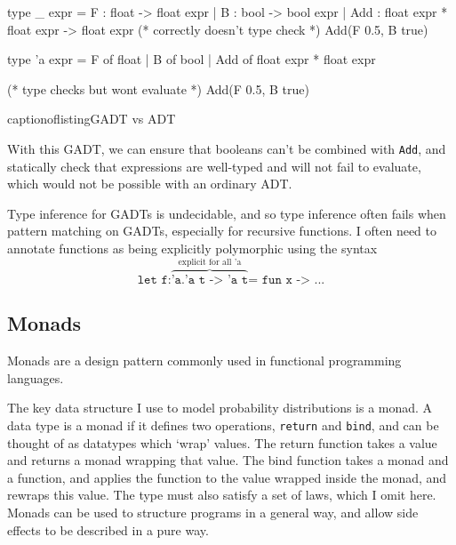 \begin{figure*}[!hbt]
	\begin{minipage}{0.5\linewidth}
		\begin{ocamlcode-in}
			type _ expr = 
			    F   : float -> float expr
			  | B   : bool -> bool expr
			  | Add : float expr * float expr 
			        -> float expr
			(* correctly doesn't type check *)
			Add(F 0.5, B true)
		\end{ocamlcode-in}
	\end{minipage}
	\begin{minipage}{0.5\linewidth}
		\begin{ocamlcode-in}
			type 'a expr = 
			    F   of float 
			  | B   of bool 
			  | Add of float expr * float expr 
			
			(* type checks but wont evaluate *)
			Add(F 0.5, B true)
		\end{ocamlcode-in}
	\end{minipage}
	captionof{listing}{GADT vs ADT}
\end{figure*}

With this GADT, we can ensure that booleans can't be combined with \texttt{Add}, and statically check that expressions are well-typed and will not fail to evaluate, which would not be possible with an ordinary ADT.
	
Type inference for GADTs is undecidable, and so type inference often fails when pattern matching on GADTs, especially for recursive functions. I often need to annotate functions as being explicitly polymorphic using the syntax
$$\texttt{let f:}\overbrace{\texttt{'a.'a t -> 'a t}}^{\text{explicit for all 'a}}\texttt{= fun x -> ...}$$
	
\subsection{Monads}
Monads are a design pattern commonly used in functional programming languages.
	
The key data structure I use to model probability distributions is a monad. A data type is a monad if it defines two operations, \texttt{return} and \texttt{bind}, and can be thought of as datatypes which `wrap' values. The return function takes a value and returns a monad wrapping that value. The bind function takes a monad and a function, and applies the function to the value wrapped inside the monad, and rewraps this value. The type must also satisfy a set of laws, which I omit here\cite{wadler1990comprehending}. Monads can be used to structure programs in a general way, and allow side effects to be described in a pure way.
	
